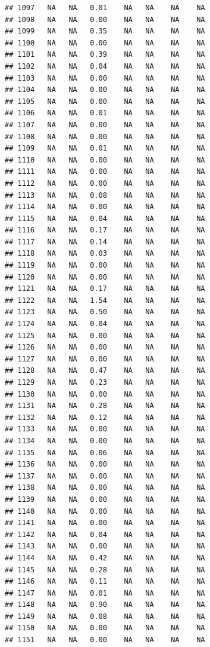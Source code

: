 \documentclass{article}\usepackage{graphicx, color}
\makeatletter
\newenvironment{kframe}{%
 \def\at@end@of@kframe{}%
 \ifinner\ifhmode%
  \def\at@end@of@kframe{\end{minipage}}%
  \begin{minipage}{\columnwidth}%
 \fi\fi%
 \def\FrameCommand##1{\hskip\@totalleftmargin \hskip-\fboxsep
 \colorbox{shadecolor}{##1}\hskip-\fboxsep
     \hskip-\linewidth \hskip-\@totalleftmargin \hskip\columnwidth}%
 \MakeFramed {\advance\hsize-\width
   \@totalleftmargin\z@ \linewidth\hsize
   \@setminipage}}%
 {\par\unskip\endMakeFramed%
 \at@end@of@kframe}
\newenvironment{knitrout}{}{} %
\makeatother
\begin{document}
\begin{knitrout}
\begin{kframe}
\begin{verbatim}
## 1097   NA   NA   0.01    NA   NA    NA    NA
## 1098   NA   NA   0.00    NA   NA    NA    NA
## 1099   NA   NA   0.35    NA   NA    NA    NA
## 1100   NA   NA   0.00    NA   NA    NA    NA
## 1101   NA   NA   0.39    NA   NA    NA    NA
## 1102   NA   NA   0.04    NA   NA    NA    NA
## 1103   NA   NA   0.00    NA   NA    NA    NA
## 1104   NA   NA   0.00    NA   NA    NA    NA
## 1105   NA   NA   0.00    NA   NA    NA    NA
## 1106   NA   NA   0.01    NA   NA    NA    NA
## 1107   NA   NA   0.00    NA   NA    NA    NA
## 1108   NA   NA   0.00    NA   NA    NA    NA
## 1109   NA   NA   0.01    NA   NA    NA    NA
## 1110   NA   NA   0.00    NA   NA    NA    NA
## 1111   NA   NA   0.00    NA   NA    NA    NA
## 1112   NA   NA   0.00    NA   NA    NA    NA
## 1113   NA   NA   0.08    NA   NA    NA    NA
## 1114   NA   NA   0.00    NA   NA    NA    NA
## 1115   NA   NA   0.04    NA   NA    NA    NA
## 1116   NA   NA   0.17    NA   NA    NA    NA
## 1117   NA   NA   0.14    NA   NA    NA    NA
## 1118   NA   NA   0.03    NA   NA    NA    NA
## 1119   NA   NA   0.00    NA   NA    NA    NA
## 1120   NA   NA   0.00    NA   NA    NA    NA
## 1121   NA   NA   0.17    NA   NA    NA    NA
## 1122   NA   NA   1.54    NA   NA    NA    NA
## 1123   NA   NA   0.50    NA   NA    NA    NA
## 1124   NA   NA   0.04    NA   NA    NA    NA
## 1125   NA   NA   0.00    NA   NA    NA    NA
## 1126   NA   NA   0.00    NA   NA    NA    NA
## 1127   NA   NA   0.00    NA   NA    NA    NA
## 1128   NA   NA   0.47    NA   NA    NA    NA
## 1129   NA   NA   0.23    NA   NA    NA    NA
## 1130   NA   NA   0.00    NA   NA    NA    NA
## 1131   NA   NA   0.28    NA   NA    NA    NA
## 1132   NA   NA   0.12    NA   NA    NA    NA
## 1133   NA   NA   0.00    NA   NA    NA    NA
## 1134   NA   NA   0.00    NA   NA    NA    NA
## 1135   NA   NA   0.06    NA   NA    NA    NA
## 1136   NA   NA   0.00    NA   NA    NA    NA
## 1137   NA   NA   0.00    NA   NA    NA    NA
## 1138   NA   NA   0.00    NA   NA    NA    NA
## 1139   NA   NA   0.00    NA   NA    NA    NA
## 1140   NA   NA   0.00    NA   NA    NA    NA
## 1141   NA   NA   0.00    NA   NA    NA    NA
## 1142   NA   NA   0.04    NA   NA    NA    NA
## 1143   NA   NA   0.00    NA   NA    NA    NA
## 1144   NA   NA   0.42    NA   NA    NA    NA
## 1145   NA   NA   0.28    NA   NA    NA    NA
## 1146   NA   NA   0.11    NA   NA    NA    NA
## 1147   NA   NA   0.01    NA   NA    NA    NA
## 1148   NA   NA   0.90    NA   NA    NA    NA
## 1149   NA   NA   0.08    NA   NA    NA    NA
## 1150   NA   NA   0.00    NA   NA    NA    NA
## 1151   NA   NA   0.00    NA   NA    NA    NA

\end{verbatim}
\end{kframe}
\end{knitrout}
\end{document}
